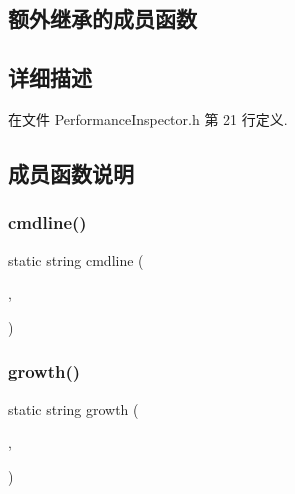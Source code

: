 \subsection*{额外继承的成员函数}


\subsection{详细描述}


在文件 Performance\+Inspector.\+h 第 21 行定义.



\subsection{成员函数说明}
\mbox{\label{classmuduo_1_1net_1_1PerformanceInspector_a505901bf0cc96fc846e7d45116b9fb5c}} 
\subsubsection{\texorpdfstring{cmdline()}{cmdline()}}
{\footnotesize\ttfamily static string cmdline (\begin{DoxyParamCaption}\item[{\hyperlink{classmuduo_1_1net_1_1HttpRequest_a2a3c0067e44c5ef3210a256d06c16b0f}{Http\+Request\+::\+Method}}]{,  }\item[{const \hyperlink{classmuduo_1_1net_1_1Inspector_aa22799cd3b4f56688d431d68c2d014a0}{Inspector\+::\+Arg\+List} \&}]{ }\end{DoxyParamCaption})\hspace{0.3cm}{\ttfamily [static]}}

\mbox{\label{classmuduo_1_1net_1_1PerformanceInspector_aaecd9a3d2a22f7bc68fe94c5517878fb}} 
\subsubsection{\texorpdfstring{growth()}{growth()}}
{\footnotesize\ttfamily static string growth (\begin{DoxyParamCaption}\item[{\hyperlink{classmuduo_1_1net_1_1HttpRequest_a2a3c0067e44c5ef3210a256d06c16b0f}{Http\+Request\+::\+Method}}]{,  }\item[{const \hyperlink{classmuduo_1_1net_1_1Inspector_aa22799cd3b4f56688d431d68c2d014a0}{Inspector\+::\+Arg\+List} \&}]{ }\end{DoxyParamCaption})\hspace{0.3cm}{\ttfamily [static]}}

